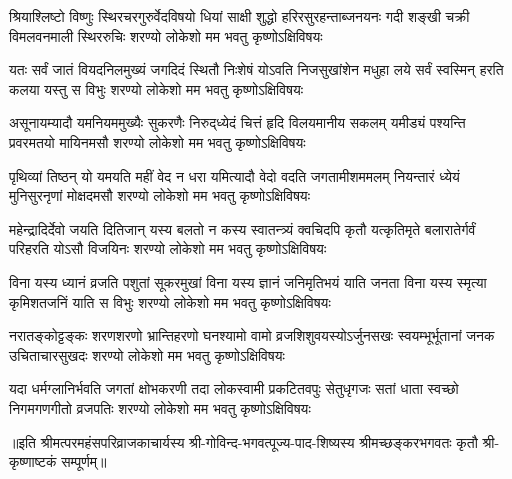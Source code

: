
\fourlineindentedshloka
{श्रियाश्लिष्टो विष्णुः स्थिरचरगुरुर्वेदविषयो}
{धियां साक्षी शुद्धो हरिरसुरहन्ताब्जनयनः}
{गदी शङ्खी चक्री विमलवनमाली स्थिररुचिः}
{शरण्यो लोकेशो मम भवतु कृष्णोऽक्षिविषयः}

\fourlineindentedshloka
{यतः सर्वं जातं वियदनिलमुख्यं जगदिदं}
{स्थितौ निःशेषं योऽवति निजसुखांशेन मधुहा}
{लये सर्वं स्वस्मिन् हरति कलया यस्तु स विभुः}
{शरण्यो लोकेशो मम भवतु कृष्णोऽक्षिविषयः}

\fourlineindentedshloka
{असूनायम्यादौ यमनियममुख्यैः सुकरणैः}
{निरुद्‌ध्येदं चित्तं हृदि विलयमानीय सकलम्}
{यमीड्यं पश्यन्ति प्रवरमतयो मायिनमसौ}
{शरण्यो लोकेशो मम भवतु कृष्णोऽक्षिविषयः}

\fourlineindentedshloka
{पृथिव्यां तिष्ठन् यो यमयति महीं वेद न धरा}
{यमित्यादौ वेदो वदति जगतामीशममलम्}
{नियन्तारं ध्येयं मुनिसुरनृणां मोक्षदमसौ}
{शरण्यो लोकेशो मम भवतु कृष्णोऽक्षिविषयः}

\fourlineindentedshloka
{महेन्द्रादिर्देवो जयति दितिजान् यस्य बलतो}
{न कस्य स्वातन्त्र्यं क्वचिदपि कृतौ यत्कृतिमृते}
{बलारातेर्गर्वं परिहरति योऽसौ विजयिनः}
{शरण्यो लोकेशो मम भवतु कृष्णोऽक्षिविषयः}

\fourlineindentedshloka
{विना यस्य ध्यानं व्रजति पशुतां सूकरमुखां}
{विना यस्य ज्ञानं जनिमृतिभयं याति जनता}
{विना यस्य स्मृत्या कृमिशतजनिं याति स विभुः}
{शरण्यो लोकेशो मम भवतु कृष्णोऽक्षिविषयः}

\fourlineindentedshloka
{नरातङ्कोट्टङ्कः शरणशरणो भ्रान्तिहरणो}
{घनश्यामो वामो व्रजशिशुवयस्योऽर्जुनसखः}
{स्वयम्भूर्भूतानां जनक उचिताचारसुखदः}
{शरण्यो लोकेशो मम भवतु कृष्णोऽक्षिविषयः}

\fourlineindentedshloka
{यदा धर्मग्लानिर्भवति जगतां क्षोभकरणी}
{तदा लोकस्वामी प्रकटितवपुः सेतुधृगजः}
{सतां धाता स्वच्छो निगमगणगीतो व्रजपतिः}
{शरण्यो लोकेशो मम भवतु कृष्णोऽक्षिविषयः}

॥इति श्रीमत्परमहंसपरिव्राजकाचार्यस्य श्री-गोविन्द-भगवत्पूज्य-पाद-शिष्यस्य
श्रीमच्छङ्करभगवतः कृतौ श्री-कृष्णाष्टकं सम्पूर्णम्॥
